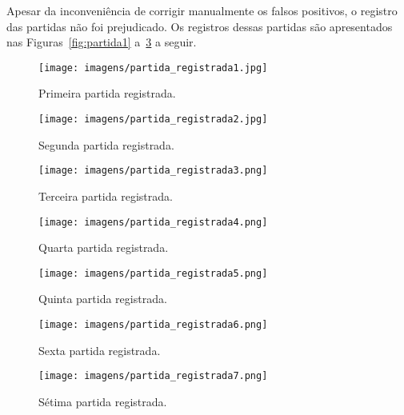 Apesar da inconveniência de corrigir manualmente os falsos positivos, o registro das partidas não foi prejudicado.
Os registros dessas partidas são apresentados nas Figuras~\ref{fig:partida1} a~\ref{fig:partida6} a seguir.

\begin{figure}[htb!]
\centering
\begin{minipage}{.49\textwidth}
  \texttt{[image: imagens/partida\_registrada1.jpg]}
  \centering
  \caption{Primeira partida registrada.}
  \label{fig:partida1}
\end{minipage}
\begin{minipage}{.5\textwidth}
  \texttt{[image: imagens/partida\_registrada2.jpg]}
  \centering
  \caption{Segunda partida registrada.}
  \label{fig:partida2}
\end{minipage}
\end{figure}

\begin{figure}[htb!]
\centering
\begin{minipage}{.49\textwidth}
  \texttt{[image: imagens/partida\_registrada3.png]}
  \centering
  \caption{Terceira partida registrada.}
  \label{fig:partida3}
\end{minipage}
\begin{minipage}{.5\textwidth}
  \texttt{[image: imagens/partida\_registrada4.png]}
  \centering
  \caption{Quarta partida registrada.}
  \label{fig:partida4}
\end{minipage}
\end{figure}

\begin{figure}[htb!]
\centering
\begin{minipage}{.49\textwidth}
  \texttt{[image: imagens/partida\_registrada5.png]}
  \centering
  \caption{Quinta partida registrada.}
  \label{fig:partida5}
\end{minipage}
\begin{minipage}{.5\textwidth}
  \texttt{[image: imagens/partida\_registrada6.png]}
  \centering
  \caption{Sexta partida registrada.}
  \label{fig:partida6}
\end{minipage}
\end{figure}

\begin{figure}[htb!]
\centering
\texttt{[image: imagens/partida\_registrada7.png]}
\centering
\caption{Sétima partida registrada.}
\label{fig:partida7}
\end{figure}

